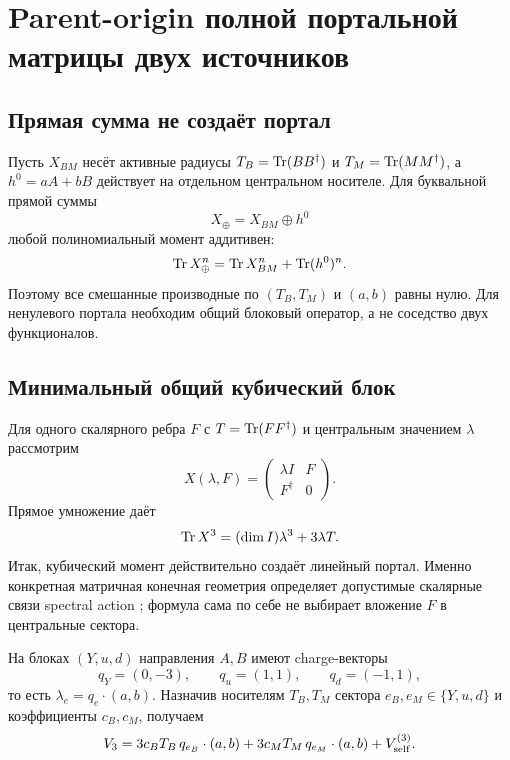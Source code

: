 \chapter{Parent-origin полной портальной матрицы двух источников}
\label{ch:v8-extra-mass-two-source-portal-origin}

\section{Прямая сумма не создаёт портал}

Пусть $X_{BM}$ несёт активные радиусы
$T_B=\operatorname{Tr}(BB^\dagger)$ и $T_M=\operatorname{Tr}(MM^\dagger)$, а
$h^0=aA+bB$ действует на отдельном центральном носителе. Для буквальной
прямой суммы
\begin{equation}
 X_\oplus=X_{BM}\oplus h^0
 \label{eq:v8-two-source-portal-direct-sum}
\end{equation}
любой полиномиальный момент аддитивен:
\begin{equation}
 \operatorname{Tr} X_\oplus^n=\operatorname{Tr} X_{BM}^n+\operatorname{Tr}(h^0)^n.
 \label{eq:v8-two-source-portal-additivity}
\end{equation}
Поэтому все смешанные производные по $(T_B,T_M)$ и $(a,b)$ равны нулю.
Для ненулевого портала необходим общий блоковый оператор, а не соседство
двух функционалов.

\section{Минимальный общий кубический блок}

Для одного скалярного ребра $F$ с $T=\operatorname{Tr}(FF^\dagger)$ и центральным
значением $\lambda$ рассмотрим
\begin{equation}
 X(\lambda,F)=\begin{pmatrix}\lambda I&F\\F^\dagger&0\end{pmatrix}.
 \label{eq:v8-two-source-portal-common-block}
\end{equation}
Прямое умножение даёт
\begin{equation}
 \operatorname{Tr} X^3=(\dim I)\lambda^3+3\lambda T.
 \label{eq:v8-two-source-portal-cubic-identity}
\end{equation}
Итак, кубический момент действительно создаёт линейный портал. Именно
конкретная матричная конечная геометрия определяет допустимые скалярные
связи spectral action \cite{v8-two-source-portal-krajewski}; формула сама
по себе не выбирает вложение $F$ в центральные сектора.

На блоках $(Y,u,d)$ направления $A,B$ имеют charge-векторы
\begin{equation}
 q_Y=(0,-3),\qquad q_u=(1,1),\qquad q_d=(-1,1),
 \label{eq:v8-two-source-portal-charge-vectors}
\end{equation}
то есть $\lambda_e=q_e\cdot(a,b)$. Назначив носителям $T_B,T_M$ сектора
$e_B,e_M\in\{Y,u,d\}$ и коэффициенты $c_B,c_M$, получаем
\begin{equation}
 V_3=3c_BT_B\,q_{e_B}\cdot(a,b)
     +3c_MT_M\,q_{e_M}\cdot(a,b)+V_{\rm self}^{(3)}.
 \label{eq:v8-two-source-portal-incidence-potential}
\end{equation}

